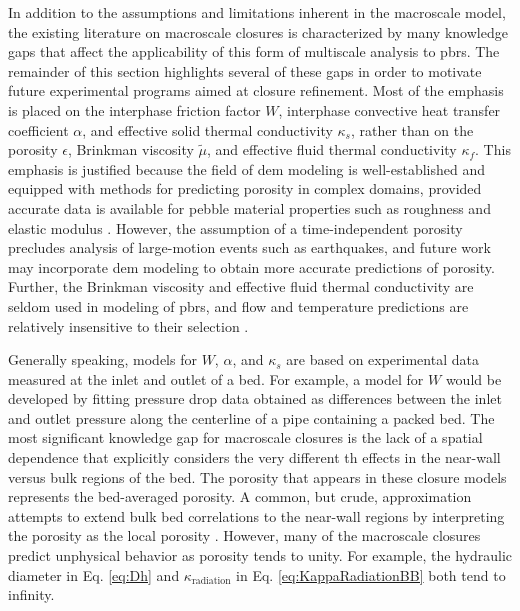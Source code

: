 In addition to the assumptions and limitations inherent in the macroscale model, the existing literature on macroscale closures is characterized by many knowledge gaps that affect the applicability of this form of multiscale analysis to \glspl{pbr}. The remainder of this section highlights several of these gaps in order to motivate future experimental programs aimed at closure refinement. Most of the emphasis is placed on the interphase friction factor \(W\), interphase convective heat transfer coefficient \(\alpha\), and effective solid thermal conductivity \(\kappa_s\), rather than on the porosity \(\epsilon\), Brinkman viscosity \(\tilde{\mu}\), and effective fluid thermal conductivity \(\kappa_f\). This emphasis is justified because the field of \gls{dem} modeling is well-established and equipped with methods for predicting porosity in complex domains, provided accurate data is available for pebble material properties such as roughness and elastic modulus \cite{lammps,openfoam,liggghts,zhang2001}. However, the assumption of a time-independent porosity precludes analysis of large-motion events such as earthquakes, and future work may incorporate \gls{dem} modeling to obtain more accurate predictions of porosity. Further, the Brinkman viscosity and effective fluid thermal conductivity are seldom used in modeling of \glspl{pbr}, and flow and temperature predictions are relatively insensitive to their selection \cite{auwerda_2011,tecdoc1163}.

Generally speaking, models for \(W\), \(\alpha\), and \(\kappa_s\) are based on experimental data measured at the inlet and outlet of a bed. For example, a model for \(W\) would be developed by fitting pressure drop data obtained as differences between the inlet and outlet pressure along the centerline of a pipe containing a packed bed. The most significant knowledge gap for macroscale closures is the lack of a spatial dependence that explicitly considers the very different \gls{th} effects in the near-wall versus bulk regions of the bed. The porosity that appears in these closure models represents the bed-averaged porosity. A common, but crude, approximation attempts to extend bulk bed correlations to the near-wall regions by interpreting the porosity as the local porosity \cite{kaviany, vortmeyer, giese, vafai}. However, many of the macroscale closures predict unphysical behavior as porosity tends to unity. For example, the hydraulic diameter in Eq. \eqref{eq:Dh} and \(\kappa_\text{radiation}\) in Eq. \eqref{eq:KappaRadiationBB} both tend to infinity.

